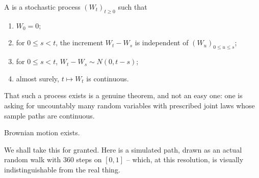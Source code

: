 \begin{definition}
	A  is a stochastic process $(W_t)_{t\geq0}$ such that
	\begin{enumerate}[label=(\roman*)]
		\item $W_0 = 0$;
		\item for $0 \leq s < t$, the increment $W_t - W_s$ is independent of $(W_u)_{0\leq u \leq s}$;
		\item for $0\leq s<t$, $W_t - W_s \sim N(0, t-s)$;
		\item almost surely, $t \mapsto W_t$ is continuous.
	\end{enumerate}
\end{definition}

That such a process exists is a genuine theorem, and not an easy one: one is asking for uncountably many random variables with prescribed joint laws whose sample paths are continuous.

\begin{theorem}[Wiener, 1923]
	Brownian motion exists.
\end{theorem}

We shall take this for granted. Here is a simulated path, drawn as an actual random walk with $360$ steps on $[0,1]$ -- which, at this resolution, is visually indistinguishable from the real thing.


